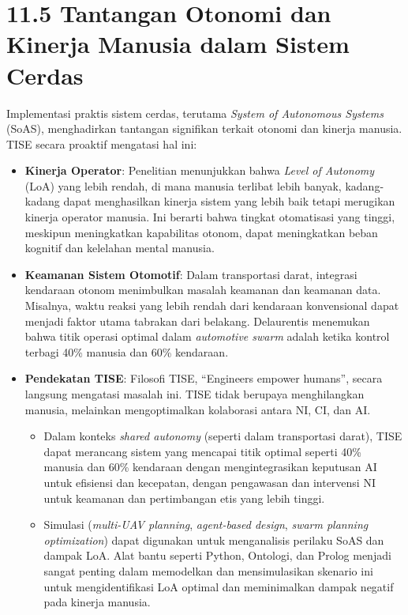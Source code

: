 \documentclass[
  letterpaper,
  DIV=11,
  numbers=noendperiod]{scrreprt}
\providecommand{\tightlist}{%
  \setlength{\itemsep}{0pt}\setlength{\parskip}{0pt}}
\begin{document}
\section{\texorpdfstring{\textbf{11.5 Tantangan Otonomi dan Kinerja
Manusia dalam Sistem
Cerdas}}{11.5 Tantangan Otonomi dan Kinerja Manusia dalam Sistem Cerdas}}\label{tantangan-otonomi-dan-kinerja-manusia-dalam-sistem-cerdas}

Implementasi praktis sistem cerdas, terutama \emph{System of Autonomous
Systems} (SoAS), menghadirkan tantangan signifikan terkait otonomi dan
kinerja manusia. TISE secara proaktif mengatasi hal ini:

\begin{itemize}
\tightlist
\item
  \textbf{Kinerja Operator}: Penelitian menunjukkan bahwa \emph{Level of
  Autonomy} (LoA) yang lebih rendah, di mana manusia terlibat lebih
  banyak, kadang-kadang dapat menghasilkan kinerja sistem yang lebih
  baik tetapi merugikan kinerja operator manusia. Ini berarti bahwa
  tingkat otomatisasi yang tinggi, meskipun meningkatkan kapabilitas
  otonom, dapat meningkatkan beban kognitif dan kelelahan mental
  manusia.
\item
  \textbf{Keamanan Sistem Otomotif}: Dalam transportasi darat, integrasi
  kendaraan otonom menimbulkan masalah keamanan dan keamanan data.
  Misalnya, waktu reaksi yang lebih rendah dari kendaraan konvensional
  dapat menjadi faktor utama tabrakan dari belakang. Delaurentis
  menemukan bahwa titik operasi optimal dalam \emph{automotive swarm}
  adalah ketika kontrol terbagi 40\% manusia dan 60\% kendaraan.
\item
  \textbf{Pendekatan TISE}: Filosofi TISE, ``Engineers empower humans'',
  secara langsung mengatasi masalah ini. TISE tidak berupaya
  menghilangkan manusia, melainkan mengoptimalkan kolaborasi antara NI,
  CI, dan AI.

  \begin{itemize}
  \tightlist
  \item
    Dalam konteks \emph{shared autonomy} (seperti dalam transportasi
    darat), TISE dapat merancang sistem yang mencapai titik optimal
    seperti 40\% manusia dan 60\% kendaraan dengan mengintegrasikan
    keputusan AI untuk efisiensi dan kecepatan, dengan pengawasan dan
    intervensi NI untuk keamanan dan pertimbangan etis yang lebih
    tinggi.
  \item
    Simulasi (\emph{multi-UAV planning}, \emph{agent-based design},
    \emph{swarm planning optimization}) dapat digunakan untuk
    menganalisis perilaku SoAS dan dampak LoA. Alat bantu seperti
    Python, Ontologi, dan Prolog menjadi sangat penting dalam memodelkan
    dan mensimulasikan skenario ini untuk mengidentifikasi LoA optimal
    dan meminimalkan dampak negatif pada kinerja manusia.
  \end{itemize}
\end{itemize}
\end{document}
